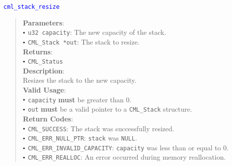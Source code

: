 \documentclass[a4paper,oneside,8pt]{extarticle}
\newcommand{\function}[1]{
  \noindent\textcolor{blue}{\texttt{#1}}
  \vspace{-0.3em}
}
\renewcommand{\dot}{\raisebox{0.3ex}{\scalebox{0.6}{$\bullet$}}}
\theoremstyle{definition}
\begin{document}
\function{cml\_stack\_resize}
\begin{quote}
  \textbf{Parameters}: \\
  $\dot$ \texttt{u32 capacity}: The new capacity of the stack. \\
  $\dot$ \texttt{CML\_Stack *out}: The stack to resize. \\
  \textbf{Returns}: \\
  $\dot$ \texttt{CML\_Status} \\
  
  \vspace{-0.75em}
  \textbf{Description}: \\
  Resizes the stack to the new capacity. \\

  \vspace{-0.75em}
  \textbf{Valid Usage}: \\
  $\dot$ \texttt{capacity} \textbf{must} be greater than 0. \\
  $\dot$ \texttt{out} \textbf{must} be a valid pointer to a \texttt{CML\_Stack} structure. \\

  \vspace{-0.75em}
  \textbf{Return Codes}: \\
  $\dot$ \texttt{CML\_SUCCESS}: The stack was successfully resized. \\
  $\dot$ \texttt{CML\_ERR\_NULL\_PTR}: \texttt{stack} was \texttt{NULL}. \\
  $\dot$ \texttt{CML\_ERR\_INVALID\_CAPACITY}: \texttt{capacity} was less than or equal to 0. \\
  $\dot$ \texttt{CML\_ERR\_REALLOC}: An error occurred during memory reallocation. \\
\end{quote}
\end{document}
